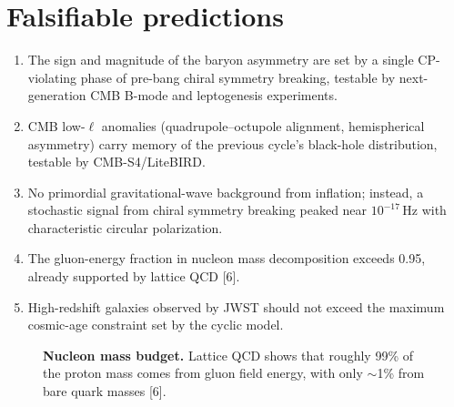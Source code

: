 \documentclass[11pt,a4paper]{article}
\begin{document}
\section{Falsifiable predictions}
\begin{enumerate}
\item[P1.] The sign and magnitude of the baryon asymmetry are set by a single CP-violating phase of pre-bang chiral symmetry breaking, testable by next-generation CMB B-mode and leptogenesis experiments.
\item[P2.] CMB low-$\ell$ anomalies (quadrupole--octupole alignment, hemispherical asymmetry) carry memory of the previous cycle's black-hole distribution, testable by CMB-S4/LiteBIRD.
\item[P3.] No primordial gravitational-wave background from inflation; instead, a stochastic signal from chiral symmetry breaking peaked near $10^{-17}$\,Hz with characteristic circular polarization.
\item[P4.] The gluon-energy fraction in nucleon mass decomposition exceeds 0.95, already supported by lattice QCD [6].
\item[P5.] High-redshift galaxies observed by JWST should not exceed the maximum cosmic-age constraint set by the cyclic model.
\end{enumerate}

\begin{figure}[htbp]
\centering
{}
\caption{\textbf{Nucleon mass budget.} Lattice QCD shows that roughly 99\% of the proton mass comes from gluon field energy, with only $\sim$1\% from bare quark masses [6].}
\label{fig:mass}
\end{figure}
\end{document}
